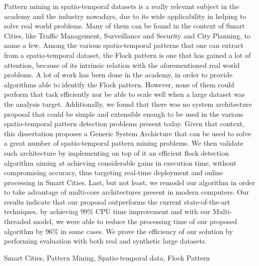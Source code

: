 Pattern mining in spatio-temporal datasets is a really relevant subject in the academy and the industry nowadays, due to
its wide applicability in helping to solve real world problems. Many of them can be found in the context of Smart
Cities, like Traffic Management, Surveillance and Security and City Planning, to name a few. Among the various
spatio-temporal patterns that one can extract from a spatio-temporal dataset, the Flock pattern is one that has gained a
lot of attention, because of its intrinsic relation with the aforementioned real world problems. A lot of work has been
done in the academy, in order to provide algorithms able to identify the Flock pattern. However, none of them could
perform that task efficiently nor be able to scale well when a large dataset was the analysis target. Additionally, we
found that there was no system architecture proposal that could be simple and extensible enough to be used in the
various spatio-temporal pattern detection problems present today. Given that context, this dissertation proposes a
Generic System Archicture that can be used to solve a great number of spatio-temporal pattern mining problems. We then
validate such architecture by implementing on top of it an efficient flock detection algorithm aiming at achieving
considerable gains in execution time, without compromising accuracy, thus targeting real-time deployment and online
processing in Smart Cities. Last, but not least, we remodel our algorithm in order to take advantage of multi-core
architectures present in modern computers. Our results indicate that our proposal outperforms the current
state-of-the-art techniques, by achieving 99\% CPU time improvement and with our Multi-threaded model, we were able to
reduce the processing time of our proposed algorithm by 96\% in some cases. We prove the efficiency of our solution by
performing evaluation with both real and synthetic large datasets.

\begin{keywords}
Smart Cities, Pattern Mining, Spatio-temporal data, Flock Pattern
\end{keywords}
